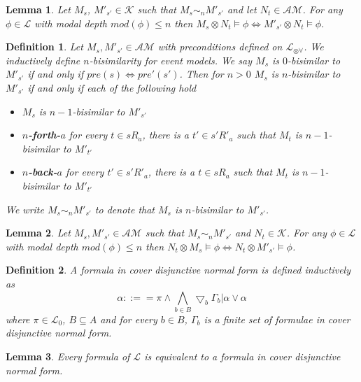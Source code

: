 \documentclass[12pt, a4paper, titlepage]{article}
\newtheorem{defn}{Definition}[subsection]
\newtheorem{lemma}{Lemma}[subsection]
\numberwithin{equation}{section}
\newcommand{\cover}{\bigtriangledown}
\newcommand{\lang}{\mathcal{L}}
\newcommand{\langArbAct}{\lang_{\otimes\forall}}
\newcommand{\langProp}{\lang_0}
\newcommand{\kripkeClass}{\mathcal{K}}
\newcommand{\eventClass}{\mathcal{AM}}
\newcommand{\FIXME}{{\bf FIXME}}
\begin{document}
\begin{lemma} \label{nBisimilarKripkeExec}
Let $M_s$, $M'_{s'} \in \kripkeClass$ such that $M_s \sim_n M'_{s'}$ and let $N_t \in \eventClass$.
For any $\phi \in \lang$ with modal depth $mod(\phi) \leq n$ then $M_s \otimes N_t \models \phi
\iff M'_{s'} \otimes N_t \models \phi.$
\end{lemma}

\begin{defn} \label{nBisimEvent}
	Let $M_s, M'_{s'} \in \eventClass$ with preconditions defined on $\langArbAct$.
	We inductively define $n$-bisimilarity for event models.
	We say $M_s$ is $0$-bisimilar to $M'_{s'}$ if and only if $pre(s) \iff pre'(s')$.
	Then for $n>0$ $M_s$ is $n$-bisimilar to $M'_{s'}$ if and only if each of the following hold
	\begin{itemize}
		\item $M_s$ is $n-1$-bisimilar to $M'_{s'}$
		\item {\bf $n$-forth-$a$} for every $t \in s R_a$, there is a $t' \in s' R'_a$ such that $M_t$ is
		$n-1$-bisimilar to $M'_{t'}$
		\item {\bf $n$-back-$a$} for every $t' \in s' R'_a$, there is a $t \in s R_a$ such that $M_t$ is
		$n-1$-bisimilar to $M'_{t'}$
	\end{itemize}
	We write $M_s \sim_n M'_{s'}$ to denote that $M_s$ is $n$-bisimilar to $M'_{s'}$.
\end{defn}

\begin{lemma} \label{nBisimilarEventExec}
	Let $M_s, M'_{s'} \in \eventClass$ such that $M_s \sim_n M'_{s'}$ and $N_t \in \kripkeClass$.
	For any $\phi \in \lang$ with modal depth $mod(\phi) \leq n$ then $N_t \otimes M_s \models \phi
	\iff N_t \otimes M'_{s'} \models \phi$.
\end{lemma}


\begin{defn} \label{coverNormal}
A formula in cover disjunctive normal form is defined inductively as
\[
	\alpha ::== \pi \land \bigwedge_{b \in B} \cover_b \Gamma_b | \alpha \lor \alpha
\]
where $\pi \in \langProp$, $B \subseteq A$ and for every $b \in B$, $\Gamma_b$ is a finite set of
formulae in cover disjunctive normal form.
\end{defn}

\begin{lemma} \label{allInCoverNormal}
Every formula of $\lang$ is equivalent to a formula in cover disjunctive normal form.
\end{lemma}
\end{document}
